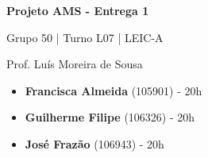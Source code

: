 \documentclass[12pt,a4paper]{article}
\begin{document}
\begin{titlepage}
  \begin{center}
    \vspace*{5cm}

    \Huge
    \textbf{Projeto AMS - Entrega 1}

    \vspace{0.5cm}
    \LARGE
    Grupo 50 | Turno L07 | LEIC-A

    \vspace{0.5cm}
    \large
    Prof. Luís Moreira de Sousa

    \vfill
  \end{center}
  \large
  \begin{itemize}
    \item[] \textbf{Francisca Almeida} (105901) - 20h
    \item[] \textbf{Guilherme Filipe} (106326) - 20h
    \item[] \textbf{José Frazão} (106943) - 20h
  \end{itemize}
\end{titlepage}
\end{document}
